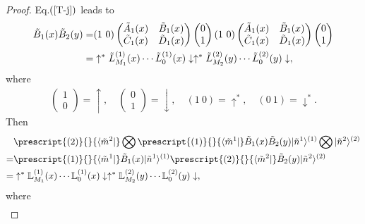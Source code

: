 \documentclass[11pt,reqno]{amsart}
\numberwithin{equation}{section}
\begin{document}
	\begin{proof}
		 Eq.$(\ref{T-j})$ leads to
		\begin{align}
			\tilde{B}_1 (x) \tilde{B}_2 (y)=&( 1\ 0 )
			\begin{pmatrix}
				\tilde{A}_1(x) & \tilde{B}_1(x) \\
				\tilde{C}_1(x) & \tilde{D}_1(x)
			\end{pmatrix}
			\begin{pmatrix}
				0 \\
				1
			\end{pmatrix}
			( 1\ 0 )
			\begin{pmatrix}
				\tilde{A}_1(x) & \tilde{B}_1(x) \\
				\tilde{C}_1(x) & \tilde{D}_1(x)
			\end{pmatrix}
			\begin{pmatrix}
				0 \\
				1
			\end{pmatrix}\notag\\
			=& \uparrow^*  \tilde{L}_{M_1}^{(1)}(x)\cdots \tilde{L}_0^{(1)}(x)\downarrow \uparrow^* \tilde{L}_{M_2}^{(2)}(y)\cdots \tilde{L}_0^{(2)}(y) \downarrow,
		\end{align}	
		where
		\begin{align}
			\begin{pmatrix}
				1 \\
				0
			\end{pmatrix}= \uparrow, \quad
			\begin{pmatrix}
				0 \\
				1
			\end{pmatrix}= \downarrow, \quad ( 1\ 0 )=\uparrow^*, \quad
			( 0\ 1 )=\downarrow^*.
		\end{align}
		Then
		\begin{align}\label{B1-B2}
			&\prescript{(2)}{}{\langle \tilde{m}^{2}|}\bigotimes \prescript{(1)}{}{\langle \tilde{m}^{1}|}
			\tilde{B}_1 (x) \tilde{B}_2 (y)
			|\tilde{n}^{1}\rangle^{(1)}\bigotimes|\tilde{n}^{2}\rangle^{(2)}\notag\\
			=&\prescript{(1)}{}{\langle \tilde{m}^{1}|}
			\tilde{B}_1 (x)
			|\tilde{n}^{1}\rangle^{(1)}
			\prescript{(2)}{}{\langle \tilde{m}^{2}|}
			\tilde{B}_2 (y)
			|\tilde{n}^{2}\rangle^{(2)}\notag\\
			=&\uparrow^*
			\mathbb{L}_{M_1}^{(1)}(x)\cdots \mathbb{L}_0^{(1)}(x)\downarrow \uparrow^* \mathbb{L}_{M_2}^{(2)}(y)\cdots \mathbb{L}_0^{(2)}(y)
			\downarrow,
		\end{align}
		where
		\begin{align}

\end{align}
\end{proof}
\end{document}
